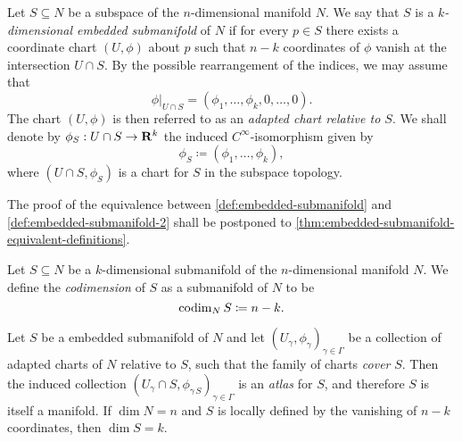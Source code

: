 \begin{definition}
    \label{def:embedded-submanifold-2}
    Let \(S \subseteq N\) be a subspace of the \(n\)-dimensional manifold \(N\). We
    say that \(S\) is a \emph{\(k\)-dimensional embedded submanifold} of \(N\) if
    for every \(p \in S\) there exists a coordinate chart \((U, \phi)\) about \(p\)
    such that \(n-k\) coordinates of \(\phi\) vanish at the intersection
    \(U \cap S\). By the possible rearrangement of the indices, we may assume that
    \[
        \phi|_{U \cap S} = (\phi_1, \dots, \phi_k, 0, \dots, 0).
    \]
    The chart \((U, \phi)\) is then referred to as an \emph{adapted chart relative to
        \(S\)}. We shall denote by \(\phi_S: U \cap S \to \mathbf{R}^k\) the induced
    \(C^{\infty}\)-isomorphism given by
    \[
        \phi_S \coloneq (\phi_1, \dots, \phi_k),
    \]
    where \((U \cap S, \phi_S)\) is a chart for \(S\) in the subspace topology.
\end{definition}

The proof of the equivalence between \cref{def:embedded-submanifold} and
\cref{def:embedded-submanifold-2} shall be postponed to
\cref{thm:embedded-submanifold-equivalent-definitions}.

\begin{definition}[Codimension]
    \label{def:codimension}
    Let \(S \subseteq N\) be a \(k\)-dimensional submanifold of the
    \(n\)-dimensional manifold \(N\). We define the \emph{codimension} of \(S\) as a
    submanifold of \(N\) to be
    \[
        \operatorname{codim}_N S \coloneq n - k.
    \]
\end{definition}

\begin{proposition}
    \label{prop:embedded-submanifold}
    Let \(S\) be a embedded submanifold of \(N\) and let
    \((U_{\gamma}, \phi_{\gamma})_{\gamma \in \Gamma}\) be a collection of adapted
    charts of \(N\) relative to \(S\), such that the family of charts \emph{cover}
    \(S\). Then the induced collection
    \((U_{\gamma} \cap S, \phi_{\gamma\, S})_{\gamma \in \Gamma}\) is an
    \emph{atlas} for \(S\), and therefore \(S\) is itself a manifold. If
    \(\dim N = n\) and \(S\) is locally defined by the vanishing of \(n-k\)
    coordinates, then \(\dim S = k\).
\end{proposition}

